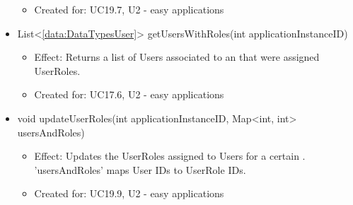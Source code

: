 \begin{description}
\begin{itemize}[noitemsep,nolistsep,leftmargin=-.25cm]
\begin{itemize}[noitemsep,nolistsep]
\item Created for: UC19.7, U2 - easy applications
        \end{itemize}
      \item \textsf{List\textless{}\ref{data:DataTypesUser}\textgreater{} getUsersWithRoles(int applicationInstanceID)}
        \begin{itemize}[noitemsep,nolistsep]
           \item Effect: Returns a list of Users associated to an  that were assigned UserRoles.
\item Created for: UC17.6, U2 - easy applications
        \end{itemize}
      \item \textsf{void updateUserRoles(int applicationInstanceID, Map\textless{}int, int\textgreater{} usersAndRoles)}
        \begin{itemize}[noitemsep,nolistsep]
           \item Effect: Updates the UserRoles assigned to Users for a certain . 'usersAndRoles' maps User IDs to UserRole IDs.
\item Created for: UC19.9, U2 - easy applications
        \end{itemize}
    \end{itemize}
    \end{description}

